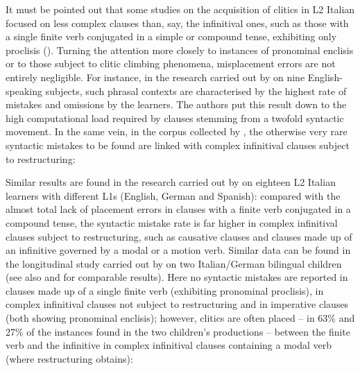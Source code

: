 \documentclass[output=paper,modfonts,nonflat,newtxmath]{langsci/langscibook}
\begin{document}
It must be pointed out that some studies on the acquisition of clitics in L2 Italian focused on less complex clauses than, say, the infinitival ones, such as those with a single finite verb conjugated in a simple or compound tense, exhibiting only proclisis (\citealt{LeoniniBelletti2004, Leonini2006}). Turning the attention more closely to instances of pronominal enclisis or to those subject to clitic climbing phenomena, misplacement errors are not entirely negligible. For instance, in the research carried out by \citet{GianniniCancila2006} on nine English-speaking subjects, such phrasal contexts are characterised by the highest rate of mistakes and omissions by the learners. The authors put this result down to the high computational load required by clauses stemming from a twofold syntactic movement. In the same vein, in the corpus collected by \citet{Berretta1986}, the otherwise very rare syntactic mistakes to be found are linked with complex infinitival clauses subject to restructuring:
\z

\z


Similar results are found in the research carried out by \citet{BennatiMatteini2006} on eighteen L2 Italian learners with different L1s (English, German and Spanish): compared with the almost total lack of placement errors in clauses with a finite verb conjugated in a compound tense, the syntactic mistake rate is far higher in complex infinitival clauses subject to restructuring, such as causative clauses and clauses made up of an infinitive governed by a modal or a motion verb. Similar data can be found in the longitudinal study carried out by \citet{Ferrari2006} on two Italian/German bilingual children (see also \citealt{BernardiniTimofte2017} and \citealt{BernardiniWeijer2017} for comparable results). Here no syntactic mistakes are reported in clauses made up of a single finite verb (exhibiting pronominal proclisis), in complex infinitival clauses not subject to restructuring and in imperative clauses (both showing pronominal enclisis); however, clitics are often placed – in 63\% and 27\% of the instances found in the two children’s productions – between the finite verb and the infinitive in complex infinitival clauses containing a modal verb (where restructuring obtains):
\end{document}
